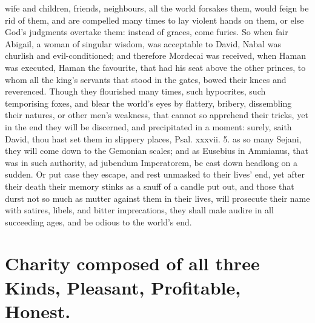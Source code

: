 {wife and children, friends, neighbours, all the world forsakes them,
would feign be rid of them, and are compelled many times to lay violent
hands on them, or else God's judgments overtake them: instead of
graces, come furies. So when fair Abigail, a woman of singular
wisdom, was acceptable to David, Nabal was churlish and
evil-conditioned; and therefore Mordecai was received, when Haman
was executed, Haman the favourite, that had his seat above the other
princes, to whom all the king's servants that stood in the gates, bowed
their knees and reverenced. Though they flourished many times, such
hypocrites, such temporising foxes, and blear the world's eyes by
flattery, bribery, dissembling their natures, or other men's weakness,
that cannot so apprehend their tricks, yet in the end they will be
discerned, and precipitated in a moment: surely, saith David, thou hast
set them in slippery places, Psal. xxxvii. 5. as so many Sejani, they
will come down to the Gemonian scales; and as Eusebius in 
Ammianus, that was in such authority, ad jubendum Imperatorem, be cast
down headlong on a sudden. Or put case they escape, and rest unmasked
to their lives' end, yet after their death their memory stinks as a
snuff of a candle put out, and those that durst not so much as mutter
against them in their lives, will prosecute their name with satires,
libels, and bitter imprecations, they shall male audire in all
succeeding ages, and be odious to the world's end.


\section[Charity]{Charity composed of all three Kinds, Pleasant, Profitable, Honest.}

}
